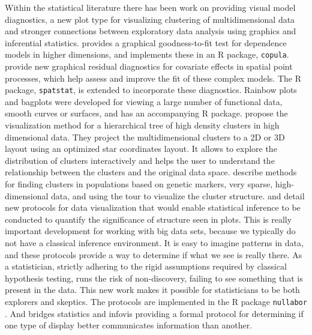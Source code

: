 \documentclass[11pt]{article}
\begin{document}
Within the statistical literature there has been work on providing visual model diagnostics, a new plot type for visualizing clustering of multidimensional data and stronger connections between exploratory data analysis using graphics and inferential statistics. \citet{hofert2013graphical} provides a graphical goodness-to-fit test for dependence models in higher dimensions, and implements these in an R package, {\tt copula}. \citet{baddeley2013residual} provide new graphical residual diagnostics for covariate effects in spatial point processes, which help assess and improve the fit of these complex models. The R package, {\tt spatstat}, is extended to incorporate these diagnostics. Rainbow plots and bagplots \citep{rainbow} were developed for viewing a large number of functional data, smooth curves or surfaces, and has an accompanying R package. \citet{van2011visualizing} propose the visualization method for a hierarchical tree of high density clusters in high dimensional data. They project the multidimensional clusters to a 2D or 3D layout using an optimized star coordinates layout. It allows to explore the distribution of clusters interactively and helps the user to understand the relationship between the clusters and the original data space. \citet{newell} describe methods for finding clusters in populations based on genetic markers, very sparse, high-dimensional data, and using the tour \citep{As85} to visualize the cluster structure. \citet{buja:2009} and \citet{majumder:2013} detail new protocols for data visualization that would enable statistical inference to be conducted to quantify the significance of structure seen in plots. This is really important development for working with big data sets, because we typically do not have a classical inference environment. It is easy to imagine patterns in data, and these protocols provide a way to determine if what we see is really there. As a statistician, strictly adhering to the rigid assumptions required by classical hypothesis testing, runs the risk of non-discovery, failing to see something that is present in the data. This new work makes it possible for statisticians to be both explorers and skeptics. The protocols are implemented in the R package {\tt nullabor} \citep{nullabor}. And \citet{hofmann:2012} bridges statistics and infovis providing a formal protocol for determining if one type of display better communicates information than another.

\end{document}
